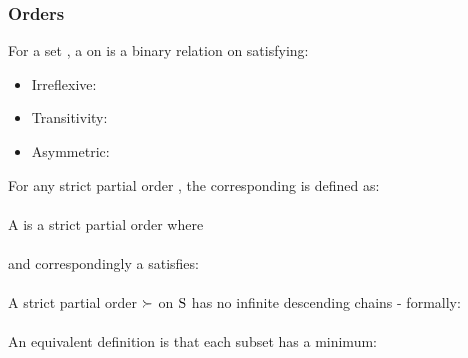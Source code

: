 \subsubsection*{Orders}\label{section:preliminaties:ordering}
For a set , a   on  is a binary relation on  satisfying:
\begin{itemize}
	\item Irreflexive: 
	\item Transitivity: 
	\item Asymmetric: 
\end{itemize}
For any strict partial order \m{\succ}, the corresponding  \m{\succeq} is defined as:\\
\\
A  is a strict partial order where \\
 \\
and correspondingly a  satisfies:\\
\\
A  strict partial order $\mathrm{\succ}$ on $\mathrm{S}$ has no infinite descending chains - formally:\\
 \\
An equivalent definition is that each subset has a minimum:\\

